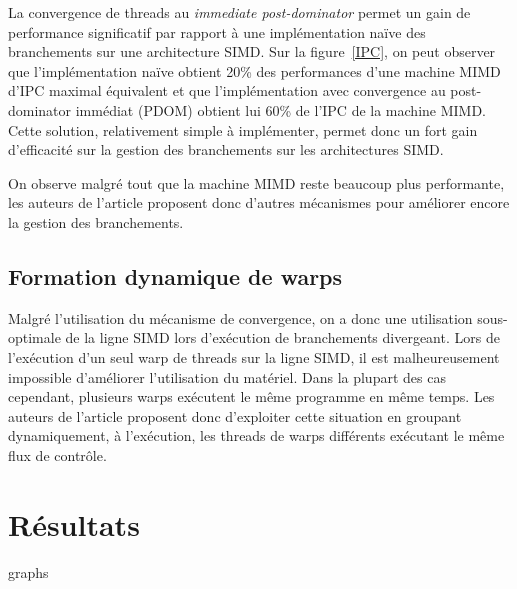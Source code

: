 \documentclass[11pt]{article}
\begin{document}
La convergence de threads au \emph{immediate post-dominator} permet un gain de performance significatif par rapport à une implémentation naïve des branchements sur une architecture SIMD.
Sur la figure~\ref{IPC}, on peut observer que l'implémentation naïve obtient 20\% des performances d'une machine MIMD d'IPC maximal équivalent et que l'implémentation avec convergence au post-dominator immédiat (PDOM) obtient lui 60\% de l'IPC de la machine MIMD.
Cette solution, relativement simple à implémenter, permet donc un fort gain d'efficacité sur la gestion des branchements sur les architectures SIMD.

On observe malgré tout que la machine MIMD reste beaucoup plus performante, les auteurs de l'article proposent donc d'autres mécanismes pour améliorer encore la gestion des branchements.

\subsection{Formation dynamique de warps}

Malgré l'utilisation du mécanisme de convergence, on a donc une utilisation sous-optimale de la ligne SIMD lors d'exécution de branchements divergeant. Lors de l'exécution d'un seul warp de threads sur la ligne SIMD, il est malheureusement impossible d'améliorer l'utilisation du matériel.
Dans la plupart des cas cependant, plusieurs warps exécutent le même programme en même temps.
Les auteurs de l'article proposent donc d'exploiter cette situation en groupant dynamiquement, à l'exécution, les threads de warps différents exécutant le même flux de contrôle.

\section{Résultats}

graphs
\end{document}
